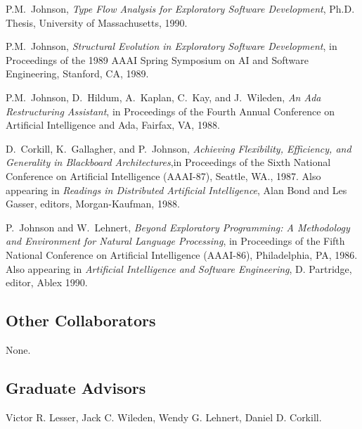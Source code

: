 \begin{Five Other Significant Publications}

\item P.M.~Johnson, {\sl Type Flow Analysis for Exploratory Software Development}, 
Ph.D. Thesis, University of Massachusetts, 1990.

\item P.M.~Johnson, {\sl Structural Evolution in Exploratory Software Development},
in Proceedings of the 1989 AAAI Spring Symposium on AI and Software Engineering,
Stanford, CA, 1989.

\item P.M.~Johnson, D.~Hildum, A.~Kaplan, C.~Kay, and J.~Wileden, {\sl An Ada
Restructuring Assistant}, in Proceedings of the Fourth Annual Conference on Artificial
Intelligence and Ada, Fairfax, VA, 1988.

\item D.~Corkill, K.~Gallagher, and P.~Johnson, {\sl Achieving Flexibility, Efficiency, 
and Generality in Blackboard Architectures},in Proceedings of the Sixth National Conference
on Artificial Intelligence (AAAI-87), Seattle, WA., 1987.  Also appearing in {\em Readings
in Distributed Artificial Intelligence}, Alan Bond and Les Gasser, editors, Morgan-Kaufman, 1988.

\item P.~Johnson and W.~Lehnert, {\em Beyond Exploratory Programming: A Methodology and 
Environment for Natural Language Processing}, in Proceedings of the Fifth National Conference
on Artificial Intelligence (AAAI-86), Philadelphia, PA, 1986.  Also appearing in 
{\em Artificial Intelligence and Software Engineering}, D. Partridge, editor, Ablex 1990.

\end{Five Other Significant Publications}


\subsection*{Other Collaborators}

None.

\subsection*{Graduate Advisors}

Victor R. Lesser, Jack C. Wileden, Wendy G. Lehnert, Daniel D. Corkill. 

